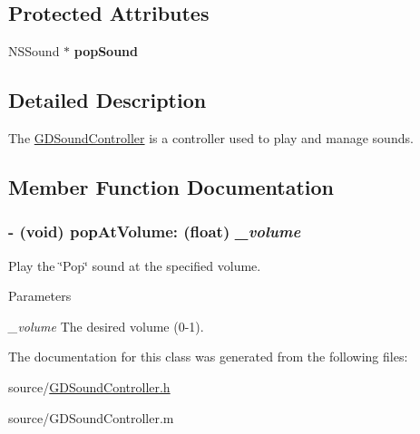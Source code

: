 \subsection*{Protected Attributes}
\begin{DoxyCompactItemize}
\item 
\hypertarget{interface_g_d_sound_controller_a1d9e081d1cb465861cd1fd5a58629fc3}{
NSSound $\ast$ {\bfseries popSound}}
\label{interface_g_d_sound_controller_a1d9e081d1cb465861cd1fd5a58629fc3}

\end{DoxyCompactItemize}


\subsection{Detailed Description}
The \hyperlink{interface_g_d_sound_controller}{GDSoundController} is a controller used to play and manage sounds. 

\subsection{Member Function Documentation}
\hypertarget{interface_g_d_sound_controller_a4dbc2b7f0f5b95d0639f986aee05390b}{
\subsubsection[{popAtVolume:}]{\setlength{\rightskip}{0pt plus 5cm}-\/ (void) popAtVolume: (float) {\em \_\-volume}}}
\label{interface_g_d_sound_controller_a4dbc2b7f0f5b95d0639f986aee05390b}


Play the \char`\"{}Pop\char`\"{} sound at the specified volume. 
\begin{DoxyParams}{Parameters}
\item[{\em \_\-volume}]The desired volume (0-\/1). \end{DoxyParams}


The documentation for this class was generated from the following files:\begin{DoxyCompactItemize}
\item 
source/\hyperlink{_g_d_sound_controller_8h}{GDSoundController.h}\item 
source/GDSoundController.m\end{DoxyCompactItemize}
